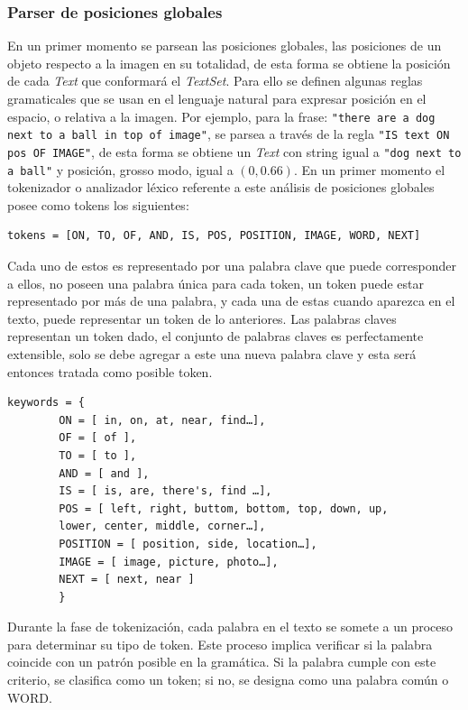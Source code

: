 \subsubsection*{Parser de posiciones globales}

En un primer momento se parsean las posiciones globales, las posiciones de un objeto respecto a la imagen en su totalidad, de esta forma se obtiene la posición de cada \textit{Text} que conformará el \textit{TextSet}. Para ello se definen algunas reglas gramaticales que se usan en el lenguaje natural para expresar posición en el espacio, o relativa a la imagen. Por ejemplo, para la frase: \verb|"there are a dog next to a ball in top of image"|, se parsea a través de la regla \verb|"IS text ON pos OF IMAGE"|, de esta forma se obtiene un \textit{Text} con string igual a \verb|"dog next to a ball"| y posici\'on, grosso modo, igual a $(0, 0.66)$. En un primer momento el tokenizador o analizador léxico referente a este análisis de posiciones globales posee como tokens los siguientes:\\

\begin{verbatim}
tokens = [ON, TO, OF, AND, IS, POS, POSITION, IMAGE, WORD, NEXT]
\end{verbatim}

Cada uno de estos es representado por una palabra clave que puede corresponder a ellos, no poseen una palabra única para cada token, un token puede estar representado por más de una palabra, y cada una de estas cuando aparezca en el texto, puede representar un token de lo anteriores. Las palabras claves representan un token dado, el conjunto de palabras claves es perfectamente extensible, solo se debe agregar a este una nueva palabra clave y esta ser\'a entonces tratada como posible token.

\begin{verbatim}
keywords = {
        ON = [ in, on, at, near, find…],
        OF = [ of ],
        TO = [ to ],
        AND = [ and ],
        IS = [ is, are, there's, find …],
        POS = [ left, right, buttom, bottom, top, down, up, 
        lower, center, middle, corner…],
        POSITION = [ position, side, location…],
        IMAGE = [ image, picture, photo…],
        NEXT = [ next, near ]
        }
\end{verbatim}

Durante la fase de tokenización, cada palabra en el texto se somete a un proceso para determinar su tipo de token. Este proceso implica verificar si la palabra coincide con un patrón posible en la gramática. Si la palabra cumple con este criterio, se clasifica como un token; si no, se designa como una palabra común o WORD.

